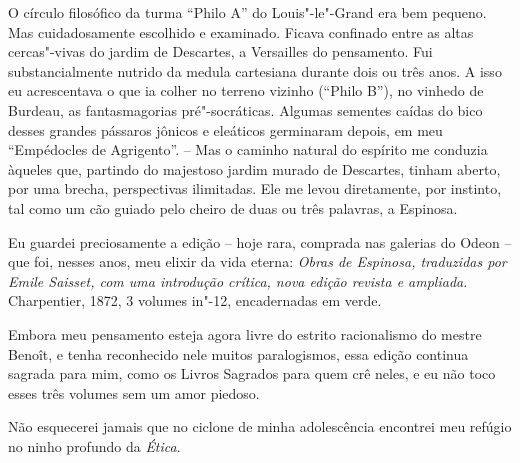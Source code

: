 O círculo filosófico da turma ``Philo A'' do Louis"-le"-Grand era bem
pequeno. Mas cuidadosamente escolhido e examinado. Ficava confinado
entre as altas cercas"-vivas do jardim de Descartes, a Versailles do
pensamento. Fui substancialmente nutrido da medula cartesiana durante
dois ou três anos. A isso eu acrescentava o que ia colher no terreno
vizinho (``Philo B''), no vinhedo de Burdeau, as fantasmagorias
pré"-socráticas. Algumas sementes caídas do bico desses grandes pássaros
jônicos e eleáticos germinaram depois, em meu ``Empédocles de
Agrigento''. -- Mas o caminho natural do espírito me conduzia àqueles
que, partindo do majestoso jardim murado de Descartes, tinham aberto,
por uma brecha, perspectivas ilimitadas. Ele me levou diretamente, por
instinto, tal como um cão guiado pelo cheiro de duas ou três palavras, a
Espinosa.

Eu guardei preciosamente a edição -- hoje rara, comprada nas galerias do
Odeon -- que foi, nesses anos, meu elixir da vida eterna: \emph{Obras de
Espinosa, traduzidas por Emile Saisset, com uma introdução crítica, nova
edição revista e ampliada}. Charpentier, 1872, 3 volumes in"-12,
encadernadas em verde.

Embora meu pensamento esteja agora livre do estrito racionalismo do
mestre Benoît, e tenha reconhecido nele muitos paralogismos, essa edição
continua sagrada para mim, como os Livros Sagrados para quem crê neles,
e eu não toco esses três volumes sem um amor piedoso.

Não esquecerei jamais que no ciclone de minha adolescência encontrei meu
refúgio no ninho profundo da \emph{Ética}.

